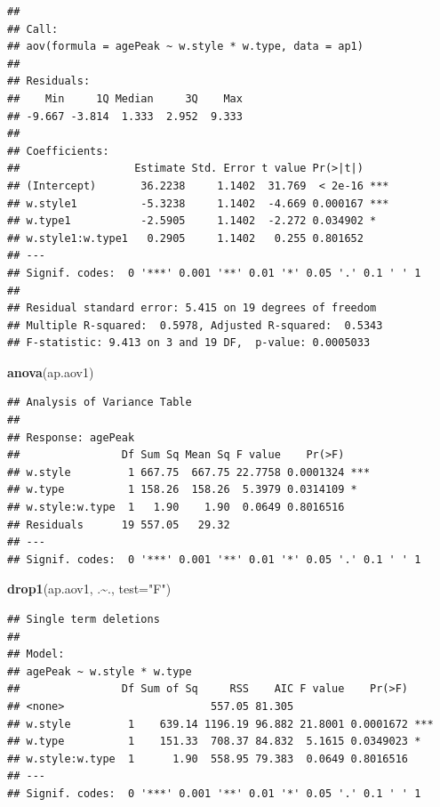 \documentclass[
]{book}
\newenvironment{Shaded}{\begin{snugshade}}{\end{snugshade}}
\newcommand{\AttributeTok}[1]{\textcolor[rgb]{0.13,0.29,0.53}{#1}}
\newcommand{\FunctionTok}[1]{\textcolor[rgb]{0.13,0.29,0.53}{\textbf{#1}}}
\newcommand{\NormalTok}[1]{#1}
\newcommand{\SpecialCharTok}[1]{\textcolor[rgb]{0.81,0.36,0.00}{\textbf{#1}}}
\newcommand{\StringTok}[1]{\textcolor[rgb]{0.31,0.60,0.02}{#1}}
\begin{document}
\begin{verbatim}
## 
## Call:
## aov(formula = agePeak ~ w.style * w.type, data = ap1)
## 
## Residuals:
##    Min     1Q Median     3Q    Max 
## -9.667 -3.814  1.333  2.952  9.333 
## 
## Coefficients:
##                  Estimate Std. Error t value Pr(>|t|)    
## (Intercept)       36.2238     1.1402  31.769  < 2e-16 ***
## w.style1          -5.3238     1.1402  -4.669 0.000167 ***
## w.type1           -2.5905     1.1402  -2.272 0.034902 *  
## w.style1:w.type1   0.2905     1.1402   0.255 0.801652    
## ---
## Signif. codes:  0 '***' 0.001 '**' 0.01 '*' 0.05 '.' 0.1 ' ' 1
## 
## Residual standard error: 5.415 on 19 degrees of freedom
## Multiple R-squared:  0.5978, Adjusted R-squared:  0.5343 
## F-statistic: 9.413 on 3 and 19 DF,  p-value: 0.0005033
\end{verbatim}

\begin{Shaded}
\begin{Highlighting}[]
\FunctionTok{anova}\NormalTok{(ap.aov1)}
\end{Highlighting}
\end{Shaded}

\begin{verbatim}
## Analysis of Variance Table
## 
## Response: agePeak
##                Df Sum Sq Mean Sq F value    Pr(>F)    
## w.style         1 667.75  667.75 22.7758 0.0001324 ***
## w.type          1 158.26  158.26  5.3979 0.0314109 *  
## w.style:w.type  1   1.90    1.90  0.0649 0.8016516    
## Residuals      19 557.05   29.32                      
## ---
## Signif. codes:  0 '***' 0.001 '**' 0.01 '*' 0.05 '.' 0.1 ' ' 1
\end{verbatim}

\begin{Shaded}
\begin{Highlighting}[]
\FunctionTok{drop1}\NormalTok{(ap.aov1, .}\SpecialCharTok{\textasciitilde{}}\NormalTok{., }\AttributeTok{test=}\StringTok{"F"}\NormalTok{)}
\end{Highlighting}
\end{Shaded}

\begin{verbatim}
## Single term deletions
## 
## Model:
## agePeak ~ w.style * w.type
##                Df Sum of Sq     RSS    AIC F value    Pr(>F)    
## <none>                       557.05 81.305                      
## w.style         1    639.14 1196.19 96.882 21.8001 0.0001672 ***
## w.type          1    151.33  708.37 84.832  5.1615 0.0349023 *  
## w.style:w.type  1      1.90  558.95 79.383  0.0649 0.8016516    
## ---
## Signif. codes:  0 '***' 0.001 '**' 0.01 '*' 0.05 '.' 0.1 ' ' 1
\end{verbatim}
\end{document}
